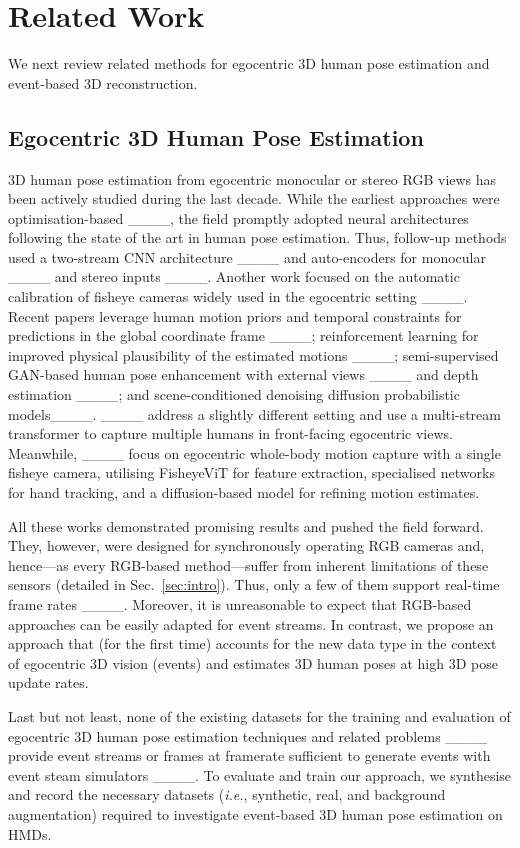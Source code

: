 \section{Related Work}
\label{sec:related_work} 
We next review related methods for egocentric 3D human pose estimation and event-based 3D reconstruction. 

\subsection{Egocentric 3D Human Pose Estimation}
3D human pose estimation from egocentric monocular or stereo RGB views has been actively studied during the last decade. 
While the earliest approaches were optimisation-based ____, the field promptly adopted neural architectures following the state of the art in human pose estimation. 
Thus, follow-up methods used a two-stream CNN architecture ____ and auto-encoders for monocular ____ and stereo inputs ____. 
Another work focused on the automatic calibration of fisheye cameras widely used in the egocentric setting ____. 
Recent papers leverage human motion priors and temporal constraints for predictions in the global coordinate frame ____; reinforcement learning for improved physical plausibility of the estimated motions ____; semi-supervised GAN-based human pose enhancement with external views ____ and depth estimation ____; and scene-conditioned denoising diffusion probabilistic models____. 
%
____ address a slightly different setting and use a multi-stream transformer to capture multiple humans in front-facing egocentric views. 
%
Meanwhile, ____ focus on egocentric whole-body motion capture with a single fisheye camera, utilising FisheyeViT for feature extraction, specialised networks for hand tracking, and a diffusion-based model for refining motion estimates.


All these works demonstrated promising results and pushed the field forward. 
They, however, were designed for synchronously operating RGB cameras and, hence---as every RGB-based method---suffer from inherent limitations of these sensors (detailed in Sec.~\ref{sec:intro}). 
Thus, only a few of them support real-time frame rates ____. 
Moreover, it is unreasonable to expect that RGB-based approaches can be easily adapted for event streams. 
In contrast, we propose an approach 
that (for the first time) accounts for the new data type in the context of egocentric 3D vision (events) and estimates 3D human poses at high 3D pose update rates. 

Last but not least, none of the existing datasets for the training and evaluation of egocentric 3D human pose estimation techniques and related problems ____ provide event streams or frames at framerate sufficient to generate events with event steam simulators ____. 
To evaluate and train our approach, we synthesise and record the necessary datasets (\textit{i.e.}, synthetic, real, and background augmentation) required to investigate event-based 3D human pose estimation on HMDs. 









